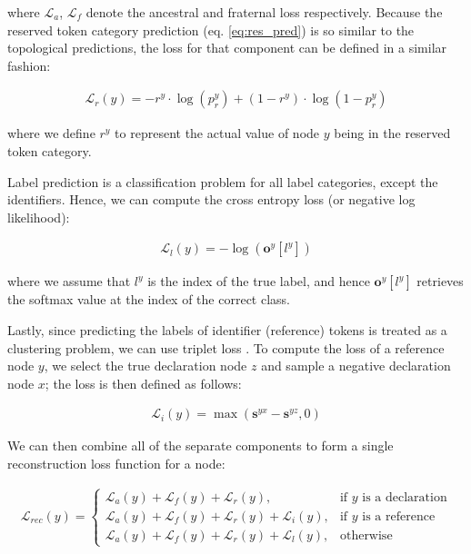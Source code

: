 \noindent where $\mathcal{L}_{a}$, $\mathcal{L}_{f}$ denote the ancestral and fraternal loss respectively. Because the reserved token category prediction (eq. \ref{eq:res_pred}) is so similar to the topological predictions, the loss for that component can be defined in a similar fashion:

\begin{align}
    \mathcal{L}_{r}(y) = - r^y \cdot \log(p^y_r) + (1 - r^y) \cdot \log(1 - p^y_r)
\end{align}

\noindent where we define $r^y$ to represent the actual value of node $y$ being in the reserved token category. 



Label prediction is a classification problem for all label categories, except the identifiers.
Hence, we can compute the cross entropy loss (or negative log likelihood):

\begin{align}
    \mathcal{L}_{l}(y) = - \log(\mathbf{o}^y[l^y])
\end{align}

\noindent where we assume that $l^y$ is the index of the true label, and hence $\mathbf{o}^y[l^y]$ retrieves the softmax value at the index of the correct class. 

Lastly, since predicting the labels of identifier (reference) tokens is treated as a clustering problem, we can use triplet loss \cite{chechik2010large}. 
To compute the loss of a reference node $y$, we select the true declaration node $z$ and sample a negative declaration node $x$; the loss is then defined as follows:

\begin{align}
    \mathcal{L}_i(y)=\max(\mathbf{s}^{yx} - \mathbf{s}^{yz},0)
\end{align}

\noindent We can then combine all of the separate components to form a single reconstruction loss function for a node:

\begin{small}
\begin{align}
   \mathcal{L}_{rec}(y) = 
\begin{cases}
    \mathcal{L}_{a}(y) + \mathcal{L}_{f}(y) + \mathcal{L}_{r}(y),& \text{if } y \text{ is a declaration} \\
    \mathcal{L}_{a}(y) + \mathcal{L}_{f}(y) + \mathcal{L}_{r}(y) + \mathcal{L}_{i}(y),& \text{if } y \text{ is a reference} \\
    \mathcal{L}_{a}(y) + \mathcal{L}_{f}(y) + \mathcal{L}_{r}(y) + \mathcal{L}_{l}(y),& \text{otherwise}
\end{cases}
\end{align}
\end{small}

